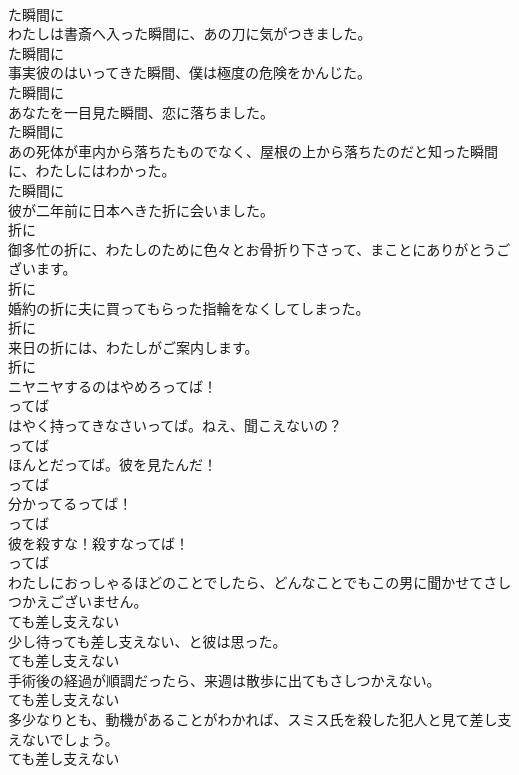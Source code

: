 \documentclass[8pt]{extreport}
\begin{document}
\begin{CJK}{UTF8}{min}
\\	た瞬間に	
\\	わたしは書斎へ入った瞬間に、あの刀に気がつきました。	
\\	た瞬間に	
\\	事実彼のはいってきた瞬間、僕は極度の危険をかんじた。	
\\	た瞬間に	
\\	あなたを一目見た瞬間、恋に落ちました。	
\\	た瞬間に	
\\	あの死体が車内から落ちたものでなく、屋根の上から落ちたのだと知った瞬間に、わたしにはわかった。	
\\	た瞬間に	
\\	彼が二年前に日本へきた折に会いました。	
\\	折に	
\\	御多忙の折に、わたしのために色々とお骨折り下さって、まことにありがとうございます。	
\\	折に	
\\	婚約の折に夫に買ってもらった指輪をなくしてしまった。	
\\	折に	
\\	来日の折には、わたしがご案内します。	
\\	折に	
\\	ニヤニヤするのはやめろってば！	
\\	ってば	
\\	はやく持ってきなさいってば。ねえ、聞こえないの？	
\\	ってば	
\\	ほんとだってば。彼を見たんだ！	
\\	ってば	
\\	分かってるってば！	
\\	ってば	
\\	彼を殺すな！殺すなってば！	
\\	ってば	
\\	わたしにおっしゃるほどのことでしたら、どんなことでもこの男に聞かせてさしつかえございません。	
\\	ても差し支えない	
\\	少し待っても差し支えない、と彼は思った。	
\\	ても差し支えない	
\\	手術後の経過が順調だったら、来週は散歩に出てもさしつかえない。	
\\	ても差し支えない	
\\	多少なりとも、動機があることがわかれば、スミス氏を殺した犯人と見て差し支えないでしょう。	
\\	ても差し支えない	

\end{CJK}
\end{document}
